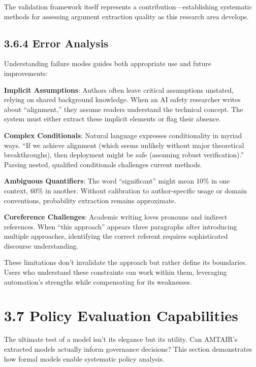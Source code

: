 \documentclass[
  11pt,
  letterpaper,
]{book}
\begin{document}
The validation framework itself represents a contribution---establishing
systematic methods for assessing argument extraction quality as this
research area develops.

\subsection{3.6.4 Error Analysis}\label{sec-error-analysis}

Understanding failure modes guides both appropriate use and future
improvements:

\textbf{Implicit Assumptions}: Authors often leave critical assumptions
unstated, relying on shared background knowledge. When an AI safety
researcher writes about ``alignment,'' they assume readers understand
the technical concept. The system must either extract these implicit
elements or flag their absence.

\textbf{Complex Conditionals}: Natural language expresses conditionality
in myriad ways. ``If we achieve alignment (which seems unlikely without
major theoretical breakthroughs), then deployment might be safe
(assuming robust verification).'' Parsing nested, qualified conditionals
challenges current methods.

\textbf{Ambiguous Quantifiers}: The word ``significant'' might mean 10\%
in one context, 60\% in another. Without calibration to author-specific
usage or domain conventions, probability extraction remains approximate.

\textbf{Coreference Challenges}: Academic writing loves pronouns and
indirect references. When ``this approach'' appears three paragraphs
after introducing multiple approaches, identifying the correct referent
requires sophisticated discourse understanding.

These limitations don't invalidate the approach but rather define its
boundaries. Users who understand these constraints can work within them,
leveraging automation's strengths while compensating for its weaknesses.

\section{3.7 Policy Evaluation
Capabilities}\label{sec-policy-evaluation}

The ultimate test of a model isn't its elegance but its utility. Can
AMTAIR's extracted models actually inform governance decisions? This
section demonstrates how formal models enable systematic policy
analysis.
\end{document}
